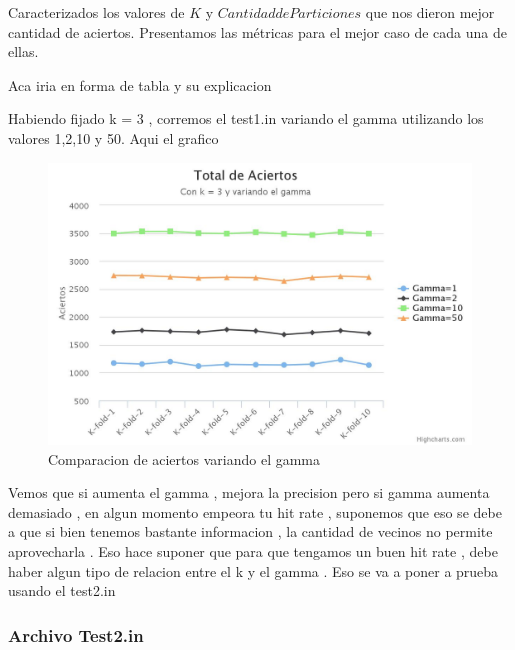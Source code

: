 Caracterizados los valores de $K$ y $Cantidad de Particiones$ que nos dieron mejor cantidad de aciertos. Presentamos las métricas para el mejor caso de cada una de ellas.

Aca iria en forma de tabla y su explicacion



Habiendo fijado k = 3 , corremos el test1.in variando el gamma utilizando los valores 1,2,10 y 50. Aqui el grafico
\begin{figure}[H]
\centering
\includegraphics[width=1\textwidth]{chart.jpeg}
\caption{Comparacion de aciertos variando el gamma}
\label{fig:Comparacion de tecnicas}
\end{figure}


Vemos que si aumenta el gamma , mejora la precision pero si gamma aumenta demasiado , en algun momento empeora tu hit rate , suponemos que eso se debe a que si bien tenemos bastante informacion , la cantidad de vecinos no permite aprovecharla . Eso hace suponer que para que tengamos un buen hit rate , debe haber algun tipo de relacion entre el k y el gamma . Eso se va a poner a prueba usando el test2.in

\subsubsection {Archivo Test2.in}




